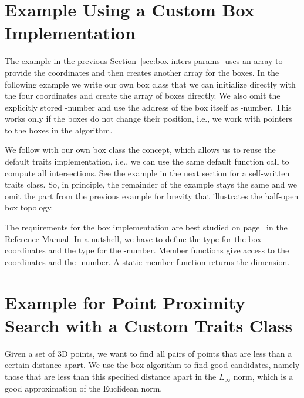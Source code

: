 \section{Example Using a Custom Box Implementation}

The example in the previous Section~\ref{sec:box-inters-params} uses
an array to provide the coordinates and then creates another array for
the boxes. In the following example we write our own box class
 that we can initialize directly with the four coordinates and
create the array of boxes directly. We also omit the explicitly stored
-number and use the address of the box itself as
-number. This works only if the boxes do not change their
position, i.e., we work with pointers to the boxes in the 
algorithm.

We follow with our own box class  the
 concept, which allows us to reuse the
default traits implementation, i.e., we can use the same default
function call to compute all intersections. See the example in the
next section for a self-written traits class. So, in principle, the
remainder of the example stays the same and we omit the part from the
previous example for brevity that illustrates the half-open box topology.

The requirements for the box implementation are best studied on
page~\pageref{ccRef_BoxIntersectionBox_d} in the Reference Manual. In a
nutshell, we have to define the type  for the box coordinates
and the type  for the -number. Member functions
give access to the coordinates and the -number. A static
member function returns the dimension.



\section{Example for Point Proximity Search with a Custom Traits Class}
\label{sec:box_inters_example_proximity}

Given a set of 3D points, we want to find all pairs of points that are
less than a certain distance apart. We use the box 
algorithm to find good candidates, namely those that are less than
this specified distance apart in the $L_\infty$ norm, which is a good
approximation of the Euclidean norm.

